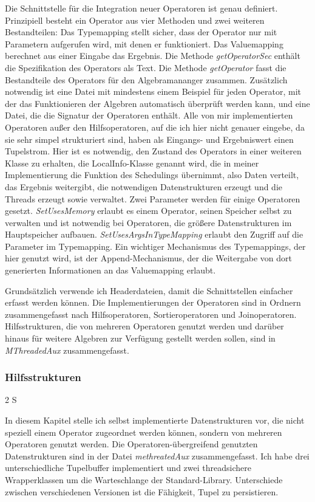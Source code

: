 \documentclass[a4paper,12pt,twoside]{article}
\newcommand{\Fb}[1]{\textit{#1}} %
\begin{document}
Die Schnittstelle für die Integration neuer Operatoren ist genau definiert. Prinzipiell besteht ein Operator aus vier Methoden und zwei weiteren Bestandteilen: Das Typemapping stellt sicher, dass der Operator nur mit Parametern aufgerufen wird, mit denen er funktioniert. Das Valuemapping berechnet aus einer Eingabe das Ergebnis. Die Methode \Fb{getOperatorSec} enthält die Spezifikation des Operators als Text. Die Methode \Fb{getOperator} fasst die Bestandteile des Operators für den Algebramananger zusammen. Zusätzlich notwendig ist eine Datei mit mindestens einem Beispiel für jeden Operator, mit der das Funktionieren der Algebren automatisch überprüft werden kann, und eine Datei, die die Signatur der Operatoren enthält. Alle von mir implementierten Operatoren außer den Hilfsoperatoren, auf die ich hier nicht genauer eingebe, da sie sehr simpel strukturiert sind, haben als Eingangs- und Ergebniswert einen Tupelstrom. Hier ist es notwendig, den Zustand des Operators in einer weiteren Klasse zu erhalten, die LocalInfo-Klasse genannt wird, die in meiner Implementierung die Funktion des Schedulings übernimmt, also Daten verteilt, das Ergebnis weitergibt, die notwendigen Datenstrukturen erzeugt und die Threads erzeugt sowie verwaltet. Zwei Parameter werden für einige Operatoren gesetzt. \Fb{SetUsesMemory} erlaubt es einem Operator, seinen Speicher selbst zu verwalten und ist notwendig bei Operatoren, die größere Datenstrukturen im Hauptspeicher aufbauen. \Fb{SetUsesArgsInTypeMapping} erlaubt den Zugriff auf die Parameter im Typemapping. Ein wichtiger Mechanismus des Typemappings, der hier genutzt wird, ist der Append-Mechanismus, der die Weitergabe von dort generierten Informationen an das Valuemapping erlaubt.

Grundsätzlich verwende ich Headerdateien, damit die Schnittstellen einfacher erfasst werden können. Die Implementierungen der Operatoren sind in Ordnern zusammengefasst nach Hilfsoperatoren, Sortieroperatoren und Joinoperatoren. Hilfsstrukturen, die von mehreren Operatoren genutzt werden und darüber hinaus für weitere Algebren zur Verfügung gestellt werden sollen, sind in \Fb{MThreadedAux} zusammengefasst.

\subsubsection{Hilfsstrukturen} 2 S
\label{Hilfsstrukturen} 

In diesem Kapitel stelle ich  selbst implementierte Datenstrukturen vor, die nicht speziell einem Operator zugeordnet werden können, sondern von mehreren Operatoren genutzt werden. Die Operatoren-übergreifend genutzten Datenstrukturen sind in der Datei \Fb{methreatedAux} zusammengefasst. Ich habe drei unterschiedliche Tupelbuffer implementiert und zwei threadsichere Wrapperklassen um die Warteschlange der Standard-Library. Unterschiede zwischen verschiedenen Versionen ist die Fähigkeit, Tupel zu persistieren.
\end{document}
